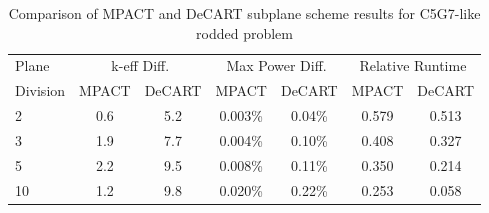 \begin{table}
\caption{Comparison of MPACT and DeCART subplane scheme results for C5G7-like rodded problem}
\begin{center}
\begin{tabular}{|l|c|c|c|c|c|c|}\hline
Plane & \multicolumn{2}{|c|}{k-eff Diff.} & \multicolumn{2}{|c|}{Max Power Diff.} & \multicolumn{2}{|c|}{Relative Runtime} \\ \cline{2-7}
Division & MPACT & DeCART & MPACT & DeCART & MPACT & DeCART \\ \hline
2 & 0.6 & 5.2 & 0.003\% & 0.04\% & 0.579 & 0.513 \\ \hline
3 & 1.9 & 7.7 & 0.004\% & 0.10\% & 0.408 & 0.327 \\ \hline
5 & 2.2 & 9.5 & 0.008\% & 0.11\% & 0.350 & 0.214 \\ \hline
10 & 1.2 & 9.8 & 0.020\% & 0.22\% & 0.253 & 0.058 \\ \hline
\end{tabular}
\end{center}
\end{table}

\begin{table}
\caption{Comparison of subplane scheme to traditional 2D/1D for VERA Progression Problem 4}
\begin{center}
\end{center}
\end{table}

